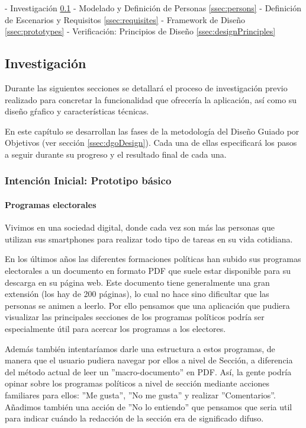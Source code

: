 - Investigación \ref{ssec:investigation}
- Modelado y Definición de Personas \ref{ssec:persons}
- Definición de Escenarios y Requisitos \ref{ssec:requisites}
- Framework de Diseño \ref{ssec:prototypes}
- Verificación: Principios de Diseño \ref{ssec:designPrinciples}

\subsection{Investigación} \label{ssec:investigation}

Durante las siguientes secciones se detallará el proceso de investigación previo realizado para concretar la funcionalidad que ofrecería la aplicación, así como su diseño gŕafico y características técnicas.

En este capítulo se desarrollan las fases de la metodología del Diseño Guiado por Objetivos (ver sección \ref{ssec:dgoDesign}). Cada una de ellas especificará los pasos a seguir durante su progreso y el resultado final de cada una.

\subsubsection{Intención Inicial: Prototipo básico}  

\paragraph{Programas electorales}

Vivimos en una sociedad digital, donde cada vez son más las personas que utilizan sus smartphones para realizar todo tipo de tareas en su vida cotidiana.

En los últimos años las diferentes formaciones políticas han subido sus programas electorales a un documento en formato PDF que suele estar disponible para su descarga en su página web. Este documento tiene generalmente una gran extensión (los hay de 200 páginas), lo cual no hace sino dificultar que las personas se animen a leerlo. Por ello pensamos que una aplicación que pudiera visualizar las principales secciones de los programas políticos podría ser especialmente útil para acercar los programas a los electores.

Además también intentaríamos darle una estructura a estos programas, de manera que el usuario pudiera navegar por ellos a nivel de Sección, a diferencia del método actual de leer un ''macro-documento'' en PDF. Así, la gente podría opinar sobre los programas políticos a nivel de sección mediante acciones familiares para ellos: ''Me gusta'', ''No me gusta'' y realizar ''Comentarios''. Añadimos también una acción de ''No lo entiendo'' que pensamos que seria util para indicar cuándo la redacción de la sección era de significado difuso.

